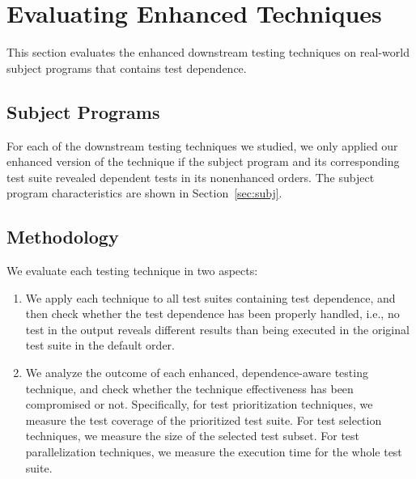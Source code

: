 
\section{Evaluating Enhanced Techniques}
\label{sec:evaluation}

This section evaluates the enhanced downstream
testing techniques on real-world subject programs
that contains test dependence.

\subsection{Subject Programs}

For each of the downstream testing techniques we studied,
we only applied our enhanced version of the technique
if the subject program and its corresponding test suite revealed
dependent tests in its nonenhanced orders. 
The subject program characteristics are shown
in Section~\ref{sec:subj}.

\subsection{Methodology}

We evaluate each testing technique in two aspects:
\begin{enumerate}
\item We apply each technique to all test suites containing
test dependence, and then check whether the test dependence
has been properly handled, i.e., no test in the output
reveals different results than being executed in the original
test suite in the default order.
\item We analyze the outcome of each enhanced,
dependence-aware testing technique, and check whether
the technique effectiveness has been compromised or not.
Specifically, for test prioritization techniques, we measure
the test coverage of the prioritized test suite. For test
selection techniques, we measure the size of the selected
test subset. For test parallelization techniques, we measure
the execution time for the whole test suite.

\end{enumerate}


